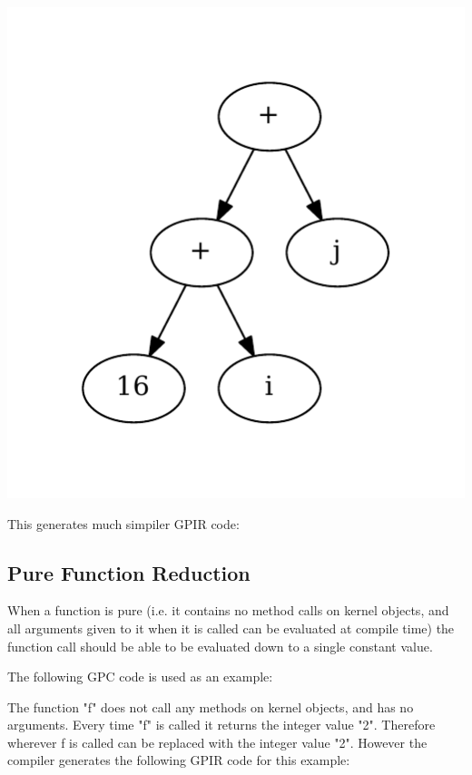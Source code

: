 \begin{center}
\includegraphics[scale=0.5]{graphs/optimalFullyEvalTree.pdf}
\end{center}

This generates much simpiler GPIR code:
 


\subsection{Pure Function Reduction}

When a function is pure (i.e. it contains no method calls
on kernel objects, and all arguments given to it when it is called can be evaluated at 
compile time) the function call should be able to be evaluated down to a single constant value.

The following GPC code is used as an example:



The function "f" does not call any methods on kernel objects, and has no arguments.
Every time "f" is called it returns the integer value "2". Therefore wherever f is called can
be replaced with the integer value "2". However the compiler generates the following GPIR code
for this example:

